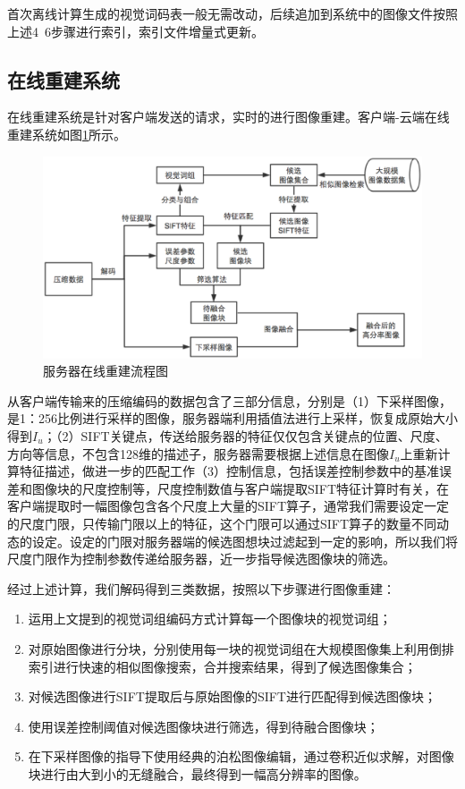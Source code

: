 首次离线计算生成的视觉词码表一般无需改动，后续追加到系统中的图像文件按照上述4~6步骤进行索引，索引文件增量式更新。

\subsection{在线重建系统}
在线重建系统是针对客户端发送的请求，实时的进行图像重建。客户端-云端在线重建系统如图\ref{fig:serverOnline}所示。

\begin{figure}
\centering\includegraphics[width=15cm]{imgs/ch4/serverOnline}
\caption{服务器在线重建流程图}
\label{fig:serverOnline}
\end{figure}

从客户端传输来的压缩编码的数据包含了三部分信息，分别是（1）下采样图像，是1：256比例进行采样的图像，服务器端利用插值法进行上采样，恢复成原始大小得到\(I_u\)；（2）SIFT关键点，传送给服务器的特征仅仅包含关键点的位置、尺度、方向等信息，不包含128维的描述子，服务器需要根据上述信息在图像\(I_u\)上重新计算特征描述，做进一步的匹配工作（3）控制信息，包括误差控制参数中的基准误差和图像块的尺度控制等，尺度控制数值与客户端提取SIFT特征计算时有关，在客户端提取时一幅图像包含各个尺度上大量的SIFT算子，通常我们需要设定一定的尺度门限，只传输门限以上的特征，这个门限可以通过SIFT算子的数量不同动态的设定。设定的门限对服务器端的候选图想块过滤起到一定的影响，所以我们将尺度门限作为控制参数传递给服务器，近一步指导候选图像块的筛选。

经过上述计算，我们解码得到三类数据，按照以下步骤进行图像重建：

\begin{enumerate}
\item 运用上文提到的视觉词组编码方式计算每一个图像块的视觉词组；
\item 对原始图像进行分块，分别使用每一块的视觉词组在大规模图像集上利用倒排索引进行快速的相似图像搜索，合并搜索结果，得到了候选图像集合；
\item 对候选图像进行SIFT提取后与原始图像的SIFT进行匹配得到候选图像块；
\item 使用误差控制阈值对候选图像块进行筛选，得到待融合图像块；
\item 在下采样图像的指导下使用经典的泊松图像编辑\cite{Perez:2003ul}，通过卷积近似求解\cite{Farbman:2011dc}，对图像块进行由大到小的无缝融合，最终得到一幅高分辨率的图像。
\end{enumerate}

